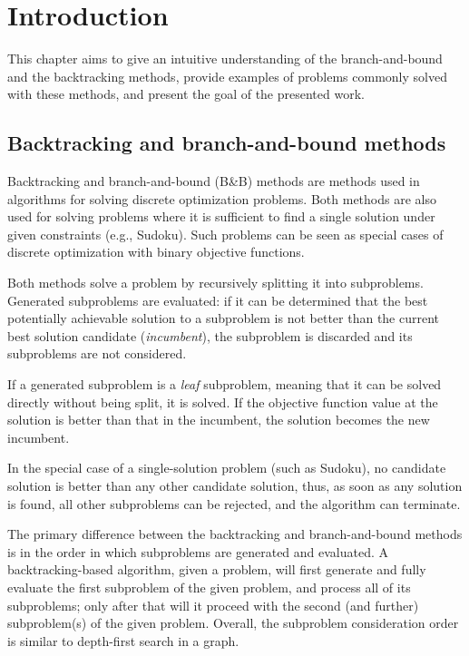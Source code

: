 \chapter{Introduction}
\label{chap:intro}

This chapter aims to give an intuitive understanding of the branch-and-bound and
the backtracking methods, provide examples of problems commonly solved with these methods,
and present the goal of the presented work.

\section{Backtracking and branch-and-bound methods}

Backtracking and branch-and-bound (B\&B) methods are methods used in
algorithms for solving discrete optimization problems. Both methods are also used for solving
problems where it is sufficient to find a single solution under given constraints
(e.g., Sudoku). Such problems can be seen as special cases of discrete optimization with
binary objective functions.

Both methods solve a problem by recursively splitting it into subproblems. Generated
subproblems are evaluated: if it can be determined that the best potentially achievable
solution to a subproblem is not better than the current best solution candidate
(\emph{incumbent}), the subproblem is discarded
and its subproblems are not considered.

If a generated subproblem is a \emph{leaf} subproblem, meaning that it can be solved directly
without being split, it is solved. If the objective function value at the solution is better
than that in the incumbent, the solution becomes the new incumbent.

In the special case of a single-solution problem (such as Sudoku), no candidate solution
is better than any other candidate solution, thus, as soon as any solution is found,
all other subproblems can be rejected, and the algorithm can terminate.

The primary difference between the backtracking and branch-and-bound methods
is in the order in which subproblems are generated and evaluated. A backtracking-based
algorithm, given a problem, will first generate and fully evaluate the first subproblem
of the given problem, and process all of its subproblems; only after that will it proceed with
the second (and further) subproblem(s) of the given problem. Overall, the subproblem
consideration order is similar to depth-first search in a graph.

